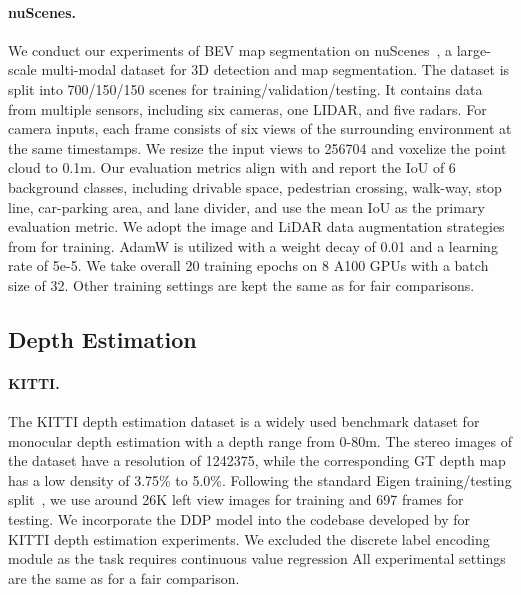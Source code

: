 \documentclass[10pt,twocolumn,letterpaper]{article}
\newcommand{\ours}[0]{DDP\xspace}
\begin{document}
\paragraph{nuScenes.}
We conduct our experiments of BEV map segmentation on nuScenes~\cite{caesar2020nuscenes}, a large-scale multi-modal dataset for 3D detection and map segmentation.
The dataset is split into 700/150/150 scenes for training/validation/testing.
It contains data from multiple sensors, including six cameras, one LIDAR, and five radars.
For camera inputs, each frame consists of six views of the surrounding  environment at the same timestamps.
We resize the input views to 256704 and voxelize the point cloud to 0.1m.
Our evaluation metrics align with \cite{liu2022bevfusion} and report the IoU of 6 background classes, including drivable space, pedestrian crossing, walk-way, stop line, car-parking area, and lane divider, and use the mean IoU as the primary evaluation metric.
We adopt the image and LiDAR data augmentation strategies from \cite{mmdetection} for training.
AdamW is utilized with a weight decay of 0.01 and a learning rate of 5e-5.
We take overall 20 training epochs on 8 A100 GPUs with a batch size of 32.
Other training settings are kept the same as \cite{liu2022bevfusion} for fair comparisons.
\subsection{Depth Estimation}
\paragraph{KITTI.}
The KITTI depth estimation dataset is a widely used benchmark dataset for monocular depth estimation with a depth range from 0-80m.
The stereo images of the dataset have a resolution of 1242375, while the corresponding GT depth map has a low density of 3.75\% to 5.0\%. 
Following the standard Eigen training/testing split~\cite{eigen2014depth}, we use around 26K left view images for training and 697 frames for testing.
We incorporate the \ours model into the codebase developed by \cite{li2022depthformer} for KITTI depth estimation experiments.
We excluded the discrete label encoding module as the task requires continuous value regression
All experimental settings are the same as \cite{li2022depthformer} for a fair comparison.
\end{document}

